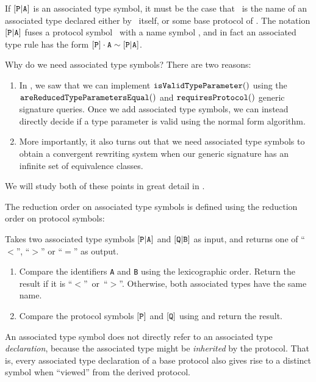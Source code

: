 \documentclass[../generics]{subfiles}
\begin{document}
If $[\texttt{P}|\texttt{A}]$ is an associated type symbol, it must be the case that \nA\ is the name of an associated type declared either by \tP\ itself, or some base protocol of \tP. The notation $[\texttt{P}|\texttt{A}]$ fuses a protocol symbol \pP\ with a name symbol \nA, and in fact an associated type rule has the form $[\texttt{P}]\cdot\texttt{A}\sim[\texttt{P}|\texttt{A}]$.

Why do we need associated type symbols? There are two reasons:
\begin{enumerate}
\item In , we saw that we can implement $\texttt{isValidTypeParameter}()$ using the $\texttt{areReducedTypeParametersEqual}()$ and $\texttt{requiresProtocol}()$ generic signature queries. Once we add associated type symbols, we can instead directly decide if a type parameter is valid using the normal form algorithm.

\item More importantly, it also turns out that we need associated type symbols to obtain a convergent rewriting system when our generic signature has an infinite set of equivalence classes.
\end{enumerate}
We will study both of these points in great detail in .

The reduction order on associated type symbols is defined using the reduction order on protocol symbols:
\begin{algorithm}\label{associated type reduction order} Takes two associated type symbols $[\texttt{P}|\texttt{A}]$ and $[\texttt{Q}|\texttt{B}]$ as input, and returns one of ``$<$'', ``$>$'' or ``$=$'' as output.
\begin{enumerate}
\item Compare the identifiers \texttt{A} and \texttt{B} using the lexicographic order. Return the result if it is ``$<$''~or~``$>$''. Otherwise, both associated types have the same name.
\item Compare the protocol symbols $[\texttt{P}]$ and $[\texttt{Q}]$ using  and return the result.
\end{enumerate}
\end{algorithm}

An associated type symbol does not directly refer to an associated type \emph{declaration}, because the associated type might be \emph{inherited} by the protocol. That is, every associated type declaration of a base protocol also gives rise to a distinct symbol when ``viewed'' from the derived protocol.
\end{document}
